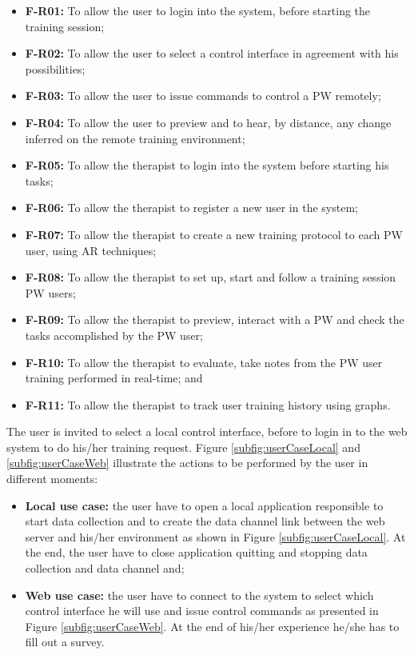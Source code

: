 \begin{itemize}
\item \textbf{F-R01:} To allow the user to login into the system, before starting the training session;
\item \textbf{F-R02:} To allow the user to select a control interface in agreement with his possibilities; 
\item \textbf{F-R03:} To allow the user to issue commands to control a PW remotely;
\item \textbf{F-R04:} To allow the user to preview and to hear, by distance, any change inferred on the remote training environment;
\item \textbf{F-R05:} To allow the therapist to login into the system before starting his tasks;
\item \textbf{F-R06:} To allow the therapist to register a new user in the system;
\item \textbf{F-R07:} To allow the therapist to create a new training protocol to each PW user, using AR techniques;
\item \textbf{F-R08:} To allow the therapist to set up, start and follow a training session PW users;
\item \textbf{F-R09:} To allow the therapist to preview, interact with a PW and check the tasks accomplished by the PW user;
\item \textbf{F-R10:} To allow the therapist to evaluate, take notes from the PW user training performed in real-time; and
\item \textbf{F-R11:} To allow the therapist to track user training history using graphs.
\end{itemize}


The user is invited to select a local control interface, before to login in to the web system to do his/her training request. Figure \ref{subfig:userCaseLocal} and \ref{subfig:userCaseWeb} illustrate the actions to be performed by the user in different moments:

\begin{itemize} 
\item \textbf{Local use case:} the user have to open a local application responsible to start data collection and to create the data channel link between the web server and his/her environment as shown in Figure \ref{subfig:userCaseLocal}. At the end, the user have to close application quitting and stopping data collection and data channel and;
\item \textbf{Web use case:} the user have to connect to the system to select which control interface he will use and issue control commands as presented in Figure \ref{subfig:userCaseWeb}. At the end of his/her experience he/she has to fill out a survey.
\end{itemize}

